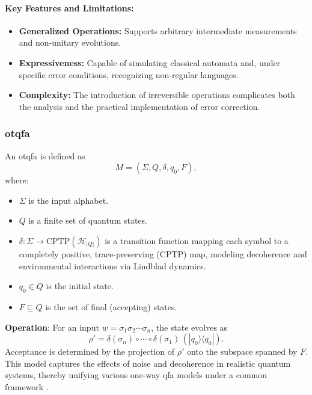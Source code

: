 \paragraph{Key Features and Limitations:}
\begin{itemize}
    \item \textbf{Generalized Operations:} Supports arbitrary intermediate measurements and non-unitary evolutions.
    \item \textbf{Expressiveness:} Capable of simulating classical automata and, under specific error conditions, recognizing non-regular languages.
    \item \textbf{Complexity:} The introduction of irreversible operations complicates both the analysis and the practical implementation of error correction.
\end{itemize}

\subsubsection{\acrfull{otqfa}}
\label{sssec:ot-qfa}
\begin{definition}
An \gls{otqfa} is defined as 
\[
M = (\Sigma, Q, \delta, q_0, F),
\]
where:
\begin{itemize}
    \item \( \Sigma \) is the input alphabet.
    \item \( Q \) is a finite set of quantum states.
    \item \( \delta: \Sigma \to \text{CPTP}(\mathcal{H}_{|Q|}) \) is a transition function mapping each symbol to a completely positive, trace-preserving (CPTP) map, modeling decoherence and environmental interactions via Lindblad dynamics.
    \item \( q_0 \in Q \) is the initial state.
    \item \( F \subseteq Q \) is the set of final (accepting) states.
\end{itemize}
\end{definition}

\textbf{Operation}:  
For an input \( w = \sigma_1\sigma_2\cdots\sigma_n \), the state evolves as
\[
\rho' = \delta(\sigma_n) \circ \cdots \circ \delta(\sigma_1) \, (|q_0\rangle\langle q_0|).
\]
Acceptance is determined by the projection of \( \rho' \) onto the subspace spanned by \( F \). This model captures the effects of noise and decoherence in realistic quantum systems, thereby unifying various one-way \gls{qfa} models under a common framework \cite{hirvensalo2012quantum}.

